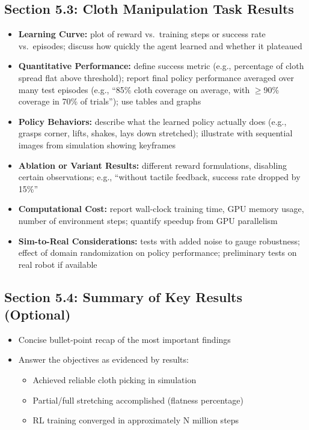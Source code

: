 \subsection{Section 5.3: Cloth Manipulation Task Results}
\begin{itemize}
    \item \textbf{Learning Curve:} plot of reward vs.\ training steps or success rate vs.\ episodes; discuss how quickly the agent learned and whether it plateaued
    \item \textbf{Quantitative Performance:} define success metric (e.g., percentage of cloth spread flat above threshold); report final policy performance averaged over many test episodes (e.g., ``85\% cloth coverage on average, with $\geq$90\% coverage in 70\% of trials''); use tables and graphs
    \item \textbf{Policy Behaviors:} describe what the learned policy actually does (e.g., grasps corner, lifts, shakes, lays down stretched); illustrate with sequential images from simulation showing keyframes
    \item \textbf{Ablation or Variant Results:} different reward formulations, disabling certain observations; e.g., ``without tactile feedback, success rate dropped by 15\%''
    \item \textbf{Computational Cost:} report wall-clock training time, GPU memory usage, number of environment steps; quantify speedup from GPU parallelism
    \item \textbf{Sim-to-Real Considerations:} tests with added noise to gauge robustness; effect of domain randomization on policy performance; preliminary tests on real robot if available
\end{itemize}

\subsection{Section 5.4: Summary of Key Results (Optional)}
\begin{itemize}
    \item Concise bullet-point recap of the most important findings
    \item Answer the objectives as evidenced by results:
    \begin{itemize}
        \item Achieved reliable cloth picking in simulation
        \item Partial/full stretching accomplished (flatness percentage)
        \item RL training converged in approximately N million steps
    \end{itemize}
\end{itemize}

